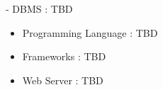 - DBMS : TBD
  \begin{itemize}
      \item Programming Language : TBD
      \item Frameworks : TBD
      \item Web Server : TBD
  \end{itemize}
